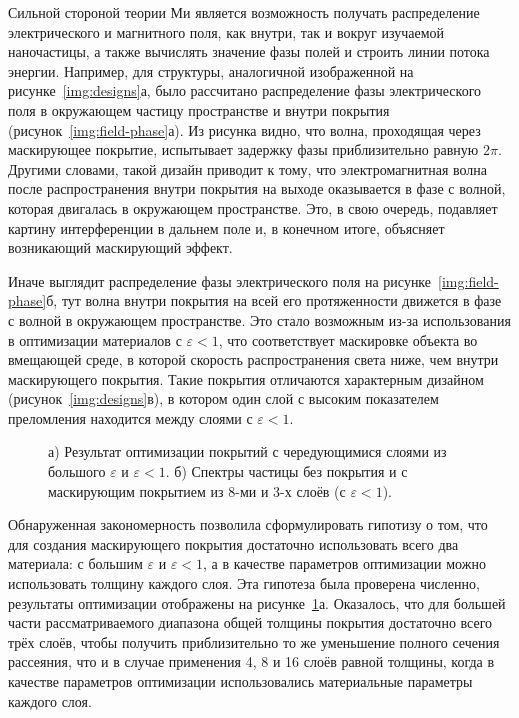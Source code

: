 Сильной стороной теории Ми является возможность получать распределение
электрического и магнитного поля, как внутри, так и вокруг изучаемой
наночастицы, а также вычислять значение фазы полей и строить линии
потока энергии.  Например, для структуры, аналогичной изображенной на
рисунке~\ref{img:designs}а, было рассчитано распределение фазы
электрического поля в окружающем частицу пространстве и внутри
покрытия (рисунок~\ref{img:field-phase}а).  Из рисунка видно, что
волна, проходящая через маскирующее покрытие, испытывает задержку фазы
приблизительно равную $2\pi$. Другими словами, такой дизайн приводит к
тому, что электромагнитная волна после распространения внутри покрытия
на выходе оказывается в фазе с волной, которая двигалась в окружающем
пространстве.  Это, в свою очередь, подавляет картину интерференции в
дальнем поле и, в конечном итоге, объясняет возникающий маскирующий
эффект.

Иначе выглядит распределение фазы электрического поля на
рисунке~\ref{img:field-phase}б, тут волна внутри покрытия на всей его
протяженности движется в фазе с волной в окружающем пространстве. Это
стало возможным из-за использования в оптимизации материалов с
${\varepsilon<1}$, что соответствует маскировке объекта во вмещающей
среде, в которой скорость распространения света ниже, чем внутри
маскирующего покрытия.  Такие покрытия отличаются характерным дизайном
(рисунок~\ref{img:designs}в), в котором один слой с высоким
показателем преломления находится между слоями с ${\varepsilon<1}$.
\begin{figure}[t]
  \begin{minipage}[ht]{0.49\linewidth}
  \end{minipage}
  \hfill
  \begin{minipage}[ht]{0.49\linewidth}
  \end{minipage}
  \caption{а) Результат оптимизации покрытий с чередующимися слоями из
    большого $\varepsilon$ и ${\varepsilon<1}$. б) Спектры частицы
  без покрытия и с маскирующим покрытием из 8-ми и 3-х слоёв (с
  ${\varepsilon<1}$).}
  \label{img:min-max-min}  
\end{figure}

Обнаруженная закономерность позволила сформулировать гипотизу о том,
что для создания маскирующего покрытия достаточно использовать всего
два материала: с большим $\varepsilon$ и ${\varepsilon<1}$, а в
качестве параметров оптимизации можно использовать толщину каждого
слоя. Эта гипотеза была проверена численно, результаты оптимизации
отображены на рисунке~\ref{img:min-max-min}а. Оказалось, что для
большей части рассматриваемого диапазона общей толщины покрытия
достаточно всего трёх слоёв, чтобы получить приблизительно то же
уменьшение полного сечения рассеяния, что и в случае применения 4, 8 и
16 слоёв равной толщины, когда в качестве параметров оптимизации
использовались материальные параметры каждого слоя.

